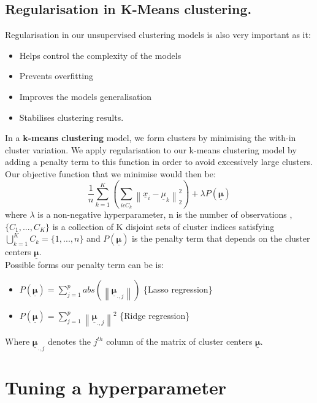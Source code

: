 \documentclass[12pt]{article}
\begin{document}
\subsection*{Regularisation in K-Means clustering.}
Regularisation in our unsupervised clustering models is also very important as it:
\begin{itemize}
    \item Helps control the complexity of the models
    \item Prevents overfitting
    \item Improves the models generalisation
    \item Stabilises clustering results.
\end{itemize}
In a \textbf{k-means clustering} model, we form clusters by minimising the with-in cluster variation.
We apply regularisation to our k-means clustering model by adding a penalty term to this function in order to
avoid excessively large clusters. Our objective function that we minimise would then be:
$$ \frac{1}{n} \sum_{k=1}^{K}\left(\sum_{i \epsilon C_k}\left\lVert \underline{x}_i - \underline{\mu}_k\right\rVert_{2}^{2} \right) + \lambda P(\boldsymbol{\underline{\mu}}) $$
where $\lambda$ is a non-negative hyperparameter, n is the number of observations ,$\{C_1,...,C_K\}$ is a collection of K disjoint sets of cluster indices satisfying
$\bigcup_{k=1}^{K}C_k = \{1,...,n\}$ and $P(\boldsymbol{\underline{\mu}})$ is the penalty term that depends on the cluster centers $\boldsymbol{\underline{\mu}}$.
\\
Possible forms our penalty term can be is:
\begin{itemize}
    \item $P(\boldsymbol{\underline{\mu}}) = \sum_{j=1}^{p} abs \left( \left\lVert\boldsymbol{\underline{\mu}}_{.,j}\right\rVert \right)$    \{Lasso regression\}
    \item $P(\boldsymbol{\underline{\mu}}) = \sum_{j=1}^{p} \left\lVert\boldsymbol{\underline{\mu}}_{.,j}\right\rVert^2$    \{Ridge regression\}
\end{itemize}
Where $\boldsymbol{\underline{\mu}}_{.,j}$ denotes the $j^{th}$ column of the matrix of cluster centers $\boldsymbol{\underline{\mu}}$.

\section*{Tuning a hyperparameter}
\end{document}
